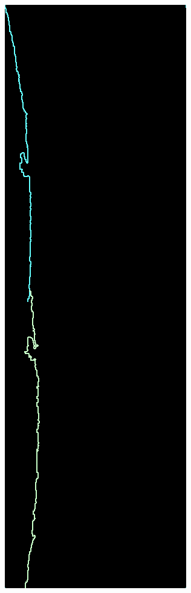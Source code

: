 \begin{figure}[H]
    \centering
    \begin{minipage}{0.24\textwidth}
        \centering
        \includegraphics[width=\textwidth]{images/0_match.png} %

\end{minipage}
\end{figure}
